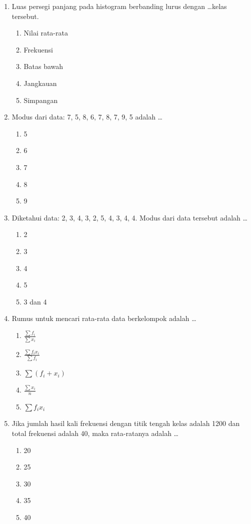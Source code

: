 \documentclass[12pt,a4paper]{article}
\begin{document}
\begin{enumerate}[leftmargin=*]
\item Luas persegi panjang pada histogram berbanding lurus dengan \dots kelas tersebut.
    \begin{enumerate}[label=\alph*.]
        \item Nilai rata-rata
        \item Frekuensi
        \item Batas bawah
        \item Jangkauan
        \item Simpangan
    \end{enumerate}

\item Modus dari data: 7, 5, 8, 6, 7, 8, 7, 9, 5 adalah \dots
    \begin{enumerate}[label=\alph*.]
        \item 5
        \item 6
        \item 7
        \item 8
        \item 9
    \end{enumerate}

\item Diketahui data: 2, 3, 4, 3, 2, 5, 4, 3, 4, 4. Modus dari data tersebut adalah \dots
    \begin{enumerate}[label=\alph*.]
        \item 2
        \item 3
        \item 4
        \item 5
        \item 3 dan 4
    \end{enumerate}

\item Rumus untuk mencari rata-rata data berkelompok adalah \dots
    \begin{enumerate}[label=\alph*.]
        \item $\frac{\sum f_i}{\sum x_i}$
        \item $\frac{\sum f_i x_i}{\sum f_i}$
        \item $\sum (f_i + x_i)$
        \item $\frac{\sum x_i}{n}$
        \item $\sum f_i x_i$
    \end{enumerate}

\item Jika jumlah hasil kali frekuensi dengan titik tengah kelas adalah 1200 dan total frekuensi adalah 40, maka rata-ratanya adalah \dots
    \begin{enumerate}[label=\alph*.]
        \item 20
        \item 25
        \item 30
        \item 35
        \item 40
    \end{enumerate}


\end{enumerate}
\end{document}
